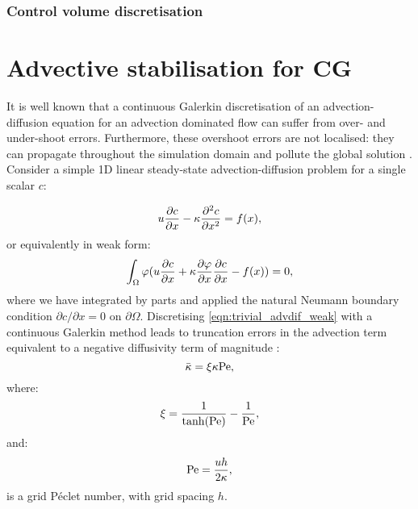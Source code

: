 \subsubsection{Control volume discretisation}
\label{ControlVolumeAdvection}




\section{Advective stabilisation for CG}
\label{Sect:ND_advective_stabilisation_CG}

It is well known that a continuous Galerkin discretisation of an
advection-diffusion equation for an advection dominated flow can suffer from
over- and under-shoot errors. Furthermore, these overshoot errors are not
localised: they can propagate throughout the simulation domain and pollute the
global solution \citep{hughes1987}. Consider a simple 1D linear steady-state
advection-diffusion problem for a single scalar $c$:

\begin{equation}\label{eqn:trivial_advdif}
  u \frac{\partial c}{\partial x} - \kappa \frac{\partial^2c}{\partial x^2} = f(x),
\end{equation}
or equivalently in weak form:
\begin{equation}\label{eqn:trivial_advdif_weak}
  \int_\Omega \varphi (u \frac{\partial c}{\partial x} + \kappa \frac{\partial\varphi}{\partial x} \frac{\partial c}{\partial x} - f(x)) = 0,
\end{equation}
where we have integrated by parts and applied the natural Neumann boundary
condition $\partial c / \partial x = 0$ on $\partial \Omega$.
Discretising \eqref{eqn:trivial_advdif_weak} with a continuous Galerkin method
leads to truncation errors in the advection term equivalent to a negative
diffusivity term of magnitude \citep{DoneaBook}:
\begin{equation}\label{eqn:cg_implicit_diffusivity}
  \bar{\kappa} = \xi \kappa \mathrm{Pe},
\end{equation}
where:
\begin{equation}\label{eqn:xi_parameter}
  \xi = \frac{1}{\tanh(\mathrm{Pe})} - \frac{1}{\mathrm{Pe}},
\end{equation}
and:
\begin{equation}\label{eqn:grid_pe}
  \mathrm{Pe} = \frac{u h}{2 \kappa},
\end{equation}
is a grid P\'eclet number, with grid spacing $h$.

